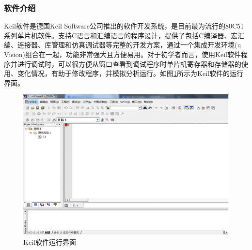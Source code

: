 \documentclass[UTF8]{ctexart}
\begin{document}
\subsubsection{软件介绍}
Keil软件是德国Keil Software公司推出的软件开发系统，是目前最为流行的80C51系列单片机软件。支持C语言和汇编语言的程序设计，提供了包括C编译器、宏汇编、连接器、库管理和仿真调试器等完整的开发方案，通过一个集成开发环境(u Vision)组合在一起，功能非常强大且方便易用。对于初学者而言，使用Keil软件程序并进行调试时，可以很方便从窗口查看到调试程序时单片机寄存器和存储器的使用、变化情况，有助于修改程序，并模拟分析运行。如图\ref{a}所示为Keil软件的运行界面。

\begin{figure}[h]
	\centering
	\includegraphics[scale = 0.8]{1}
	\caption{Keil软件运行界面}
	\label{a}
\end{figure}
\end{document}
